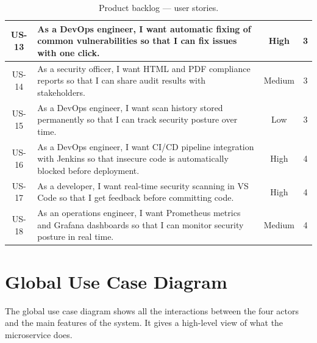 \begin{table}[H]
\begin{tabularx}{\textwidth}{|c|X|c|c|}
\hline
US-13 & As a DevOps engineer, I want automatic fixing of common vulnerabilities so that I can fix issues with one click. & High & 3 \\
\hline
US-14 & As a security officer, I want HTML and PDF compliance reports so that I can share audit results with stakeholders. & Medium & 3 \\
\hline
US-15 & As a DevOps engineer, I want scan history stored permanently so that I can track security posture over time. & Low & 3 \\
\hline
US-16 & As a DevOps engineer, I want CI/CD pipeline integration with Jenkins so that insecure code is automatically blocked before deployment. & High & 4 \\
\hline
US-17 & As a developer, I want real-time security scanning in VS Code so that I get feedback before committing code. & High & 4 \\
\hline
US-18 & As an operations engineer, I want Prometheus metrics and Grafana dashboards so that I can monitor security posture in real time. & Medium & 4 \\
\hline
\end{tabularx}
\caption{Product backlog --- user stories.}
\label{tab:product-backlog}
\end{table}


\section{Global Use Case Diagram}
\label{sec:usecase}

The global use case diagram shows all the interactions between the four actors and the main features of the system. It gives a high-level view of what the microservice does.

